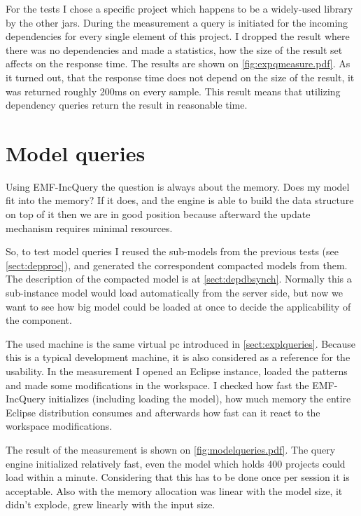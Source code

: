For the tests I chose a specific project which happens to be a widely-used
library by the other jars. During the measurement a query is initiated for 
the incoming dependencies for every single element of this project. 
I dropped the result where there was no dependencies and made a statistics, how 
the size of the result set affects on the response time.
The results are shown on \autoref{fig:expqmeasure.pdf}.
As it turned out, that the response time does not depend on the size of the result,
it was returned roughly 200ms on every sample. This result means that utilizing 
dependency queries return the result in reasonable time. 


\section{Model queries}
Using EMF-IncQuery the question is always about the memory. Does my model fit into
the memory? If it does, and the engine is able to build the data structure on top
of it then we are in good position because afterward the update mechanism requires 
minimal resources. 

So, to test model queries I reused the sub-models from the previous tests (see
\autoref{sect:depproc}), and generated the correspondent compacted models from
them.
The description of the compacted model is at \autoref{sect:depdbsynch}. Normally
this a sub-instance model would load automatically from the server side, but now
we want to see how big model could be loaded at once to decide the applicability
of the component.

The used machine is the same virtual pc introduced in
\autoref{sect:explqueries}. Because this is a typical development machine, it is
also considered as a reference for the usability. In the measurement I opened an
Eclipse instance, loaded the patterns and made some modifications in the
workspace. I checked how fast the EMF-IncQuery initializes (including loading
the model), how much memory the entire Eclipse distribution consumes and
afterwards how fast can it react to the workspace modifications.

The result of the measurement is shown on \autoref{fig:modelqueries.pdf}.
The query engine initialized relatively fast, even the model which holds 400
projects could load within a minute. Considering that this has to be done once
per session it is acceptable. Also with the memory allocation was linear with 
the model size, it didn't explode, grew linearly with the input size. 

